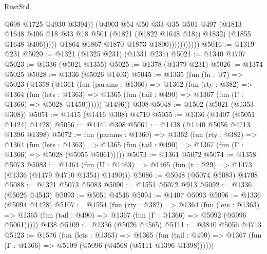\begin{lexlean}{RustStd}
\begin{coremodule}
                                    @698
                                    @1725
                                    @4930
                                    @3394))
                                (@4903
                                  @54
                                  @50
                                  @33
                                  @35
                                  @501
                                  @497
                                  (@1813
                                    @1648
                                    @406
                                    @18
                                    @33
                                    @18
                                    @501
                                    (@1821 (@1822 @1648 @18))
                                    @1832)
                                  (@1855 @1648 @406)))))
                          @1864
                          @1867
                          @1870
                          @1873
                          @1800)))))))))))
@5016 := @1319 @231
@5020 := @1321 (@1325 @231) (@1331 @231)
@5021 := @1340 @4707
@5023 := @1336 (@5021 @1355)
@5025 := @1378 (@1379 @231)
@5026 := @1374 @5025
@5028 := @1336 (@5026 @1403)
@5045 := @1335
    (fun (fn : @7) =>
    @5023
      (@1358
        (@1361
          (fun (params : @1360) =>
          @1362
            (fun (rty : @382) =>
            @1364
              (fun (lets : @1363) =>
              @1365 (fun (tail : @490) => @1367 (fun (Γ : @1366) => @5028 @1450))))))
        @1496))
    @308
@5048 := @1502 (@5021 (@1353 @308))
@5051 := @1415 (@1416 @308) @4710
@5055 := @1336 (@1407 (@5051 @1424) @1428)
@5056 := @1441 @308
@5061 := @1438 (@1440 @5056 @4713 @1396 @1398)
@5072 := fun (params : @1360) =>
  @1362
    (fun (rty : @382) =>
    @1364
      (fun (lets : @1363) =>
      @1365 (fun (tail : @490) => @1367 (fun (Γ : @1366) => @5028 (@5055 @5061)))))
@5073 := @1361 @5072
@5074 := @1358 @5073
@5083 := @1464 (fun (U : @1463) => @1465 (fun (t : @29) => @1473 (@1336 (@1479 @4710 @1354) @1490)))
@5086 := @5048 (@5074 @5083) @4708
@5088 := @1321 @5073 @5083
@5090 := @1551 @5072 @913
@5092 := @1336 (@5026 @4543)
@5093 := @5051 @4546
@5094 := @1407 @5093
@5096 := @1336 (@5094 @1428)
@5107 := @1554
    (fun (rty : @382) =>
    @1364
      (fun (lets : @1363) =>
      @1365 (fun (tail : @490) => @1367 (fun (Γ : @1366) => @5092 (@5096 @5061)))))
    @438
@5109 := @1336 (@5026 @4565)
@5111 := @3840 @5056 @4713
@5123 := @1576
    (fun (lets : @1363) =>
    @1365
      (fun (tail : @490) => @1367 (fun (Γ : @1366) => @5109 (@5096 (@4568 (@5111 @1396 @1398))))))

\end{coremodule}
\end{lexlean}
